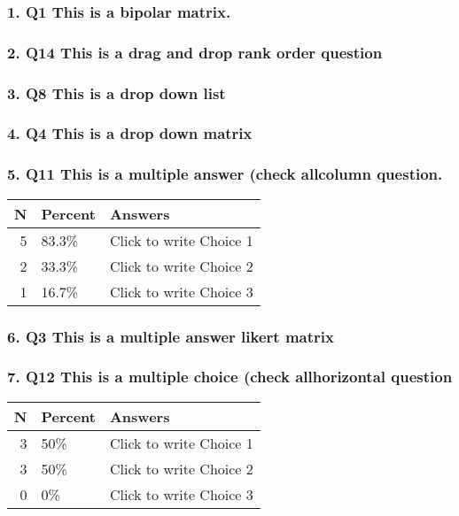 \documentclass{article}\usepackage[]{graphicx}\usepackage[]{color}
\begin{document}
\subsubsection*{1. Q1
This is a bipolar matrix.}

\hfill \break \hfill \break
\subsubsection*{2. Q14
This is a drag and drop rank order question}

\hfill \break \hfill \break
\subsubsection*{3. Q8
This is a drop down list}

\hfill \break \hfill \break
\subsubsection*{4. Q4
This is a drop down matrix}

\hfill \break \hfill \break
\subsubsection*{5. Q11
This is a multiple answer (check allcolumn question.}

\begin{tabular}{r|l|l}
\hline
N & Percent & Answers\\
\hline
5 & 83.3\% & Click to write Choice 1\\
\hline
2 & 33.3\% & Click to write Choice 2\\
\hline
1 & 16.7\% & Click to write Choice 3\\
\hline
\end{tabular}


\hfill \break \hfill \break
\subsubsection*{6. Q3
This is a multiple answer likert matrix}

\hfill \break \hfill \break
\subsubsection*{7. Q12
This is a multiple choice (check allhorizontal question}

\begin{tabular}{r|l|l}
\hline
N & Percent & Answers\\
\hline
3 & 50\% & Click to write Choice 1\\
\hline
3 & 50\% & Click to write Choice 2\\
\hline
0 & 0\% & Click to write Choice 3\\
\hline
\end{tabular}
\end{document}

